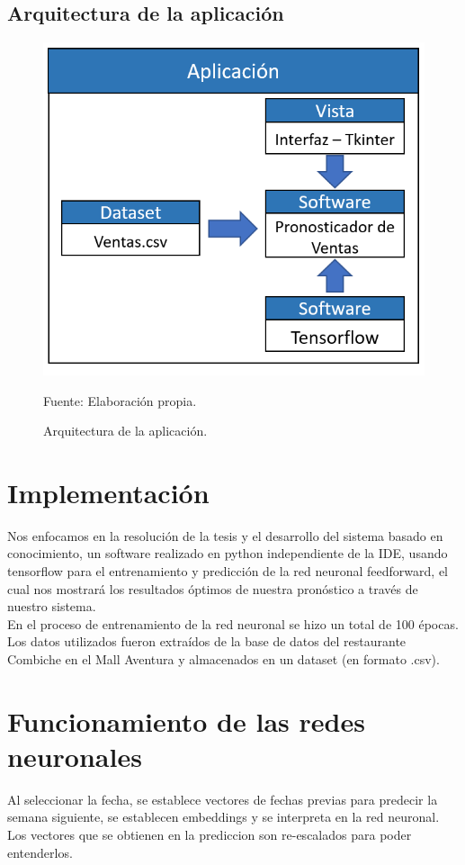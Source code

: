 \subsection{Arquitectura de la aplicación}
\begin{figure}[h!]
	\centering
		\includegraphics[scale=0.4]{imagenes/arquitecturaaplicacion.png}
		\caption{Arquitectura de la aplicación.}
	\begin{center}
    Fuente: Elaboración propia.
    \end{center}
	\label{fig:arquitecturaaaa}
\end{figure}

\section{Implementación}
Nos enfocamos en la resolución de la tesis y el desarrollo del sistema basado en conocimiento, un software realizado en python independiente de la IDE, usando tensorflow para el entrenamiento y predicción de la red neuronal feedforward, el cual nos mostrará los resultados óptimos de nuestra pronóstico a través de nuestro sistema. \\

En el proceso de entrenamiento de la red neuronal se hizo un total de 100 épocas. Los datos utilizados fueron extraídos de la base de datos del restaurante Combiche en el Mall Aventura y almacenados en un dataset (en formato .csv).


\section{Funcionamiento de las redes neuronales}
Al seleccionar la fecha, se establece vectores de fechas previas para predecir la semana siguiente, se establecen embeddings y se interpreta en la red neuronal.
Los vectores que se obtienen en la prediccion son re-escalados para poder entenderlos.

